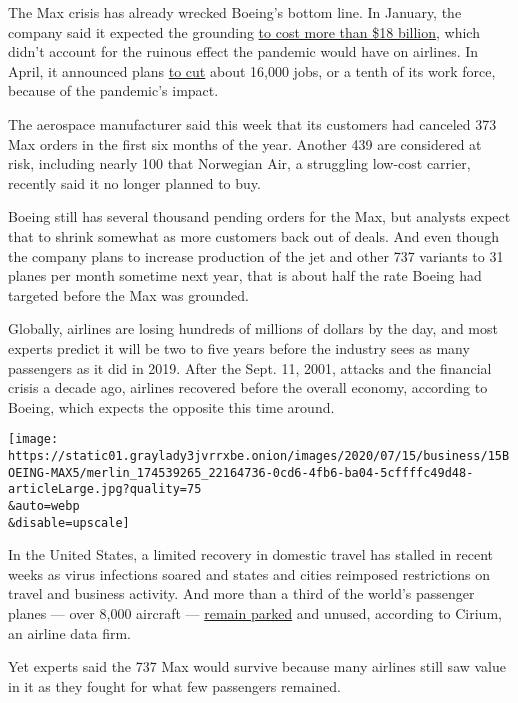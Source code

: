 The Max crisis has already wrecked Boeing's bottom line. In January, the
company said it expected the grounding
\href{https://www.nytimes3xbfgragh.onion/2020/01/29/business/boeing-737-max-costs.html}{to
cost more than \$18 billion}, which didn't account for the ruinous
effect the pandemic would have on airlines. In April, it announced plans
\href{https://www.nytimes3xbfgragh.onion/2020/04/29/business/boeing-layoffs-coronavirus.html}{to
cut} about 16,000 jobs, or a tenth of its work force, because of the
pandemic's impact.

The aerospace manufacturer said this week that its customers had
canceled 373 Max orders in the first six months of the year. Another 439
are considered at risk, including nearly 100 that Norwegian Air, a
struggling low-cost carrier, recently said it no longer planned to buy.

Boeing still has several thousand pending orders for the Max, but
analysts expect that to shrink somewhat as more customers back out of
deals. And even though the company plans to increase production of the
jet and other 737 variants to 31 planes per month sometime next year,
that is about half the rate Boeing had targeted before the Max was
grounded.

Globally, airlines are losing hundreds of millions of dollars by the
day, and most experts predict it will be two to five years before the
industry sees as many passengers as it did in 2019. After the Sept. 11,
2001, attacks and the financial crisis a decade ago, airlines recovered
before the overall economy, according to Boeing, which expects the
opposite this time around.

\texttt{[image: https://static01.graylady3jvrrxbe.onion/images/2020/07/15/business/15BOEING-MAX5/merlin\_174539265\_22164736-0cd6-4fb6-ba04-5cffffc49d48-articleLarge.jpg?quality=75\\\&auto=webp\\\&disable=upscale]}

In the United States, a limited recovery in domestic travel has stalled
in recent weeks as virus infections soared and states and cities
reimposed restrictions on travel and business activity. And more than a
third of the world's passenger planes --- over 8,000 aircraft ---
\href{https://www.cirium.com/thoughtcloud/covid-19-navigating-the-flight-plan-to-recovery-daily-update/}{remain
parked} and unused, according to Cirium, an airline data firm.

Yet experts said the 737 Max would survive because many airlines still
saw value in it as they fought for what few passengers remained.


